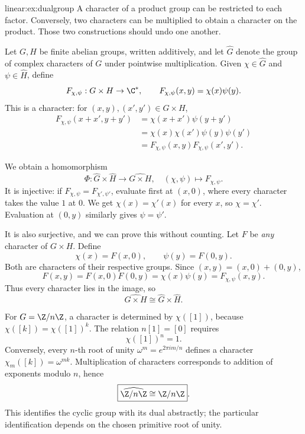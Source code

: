 \begin{solution}{linear:ex:dualgroup}
\idea A character of a product group can be restricted to each factor. Conversely, two characters can be multiplied to obtain a character on the product. Those two constructions should undo one another.

\writeup Let $G,H$ be finite abelian groups, written additively, and let $\widehat G$ denote the group of complex characters of $G$ under pointwise multiplication. Given $\chi\in\widehat G$ and $\psi\in\widehat H$, define
\[
F_{\chi,\psi}:G\times H\to\C^*,
\qquad
F_{\chi,\psi}(x,y)=\chi(x)\psi(y).
\]
This is a character: for $(x,y),(x',y')\in G\times H$,
\[
\begin{aligned}
F_{\chi,\psi}(x+x',y+y')
&=\chi(x+x')\psi(y+y')\\
&=\chi(x)\chi(x')\psi(y)\psi(y')\\
&=F_{\chi,\psi}(x,y)F_{\chi,\psi}(x',y').
\end{aligned}
\]

We obtain a homomorphism
\[
\Phi:\widehat G\times\widehat H\longrightarrow\widehat{G\times H},
\quad(\chi,\psi)\mapsto F_{\chi,\psi}.
\]
It is injective: if $F_{\chi,\psi}=F_{\chi',\psi'}$, evaluate first at $(x,0)$, where every character takes the value $1$ at $0$. We get $\chi(x)=\chi'(x)$ for every $x$, so $\chi=\chi'$. Evaluation at $(0,y)$ similarly gives $\psi=\psi'$.

It is also surjective, and we can prove this without counting. Let $F$ be \emph{any} character of $G\times H$. Define
\[
\chi(x)=F(x,0),\qquad \psi(y)=F(0,y).
\]
Both are characters of their respective groups. Since $(x,y)=(x,0)+(0,y)$,
\[
F(x,y)=F(x,0)F(0,y)=\chi(x)\psi(y)=F_{\chi,\psi}(x,y).
\]
Thus every character lies in the image, so
\[
\boxed{\widehat{G\times H}\cong\widehat G\times\widehat H}.
\]

For $G=\Z/n\Z$, a character is determined by $\chi([1])$, because $\chi([k])=\chi([1])^k$. The relation $n[1]=[0]$ requires
\[
\chi([1])^n=1.
\]
Conversely, every $n$-th root of unity $\omega^m=e^{2\pi im/n}$ defines a character $\chi_m([k])=\omega^{mk}$. Multiplication of characters corresponds to addition of exponents modulo $n$, hence
\[
\boxed{\widehat{\Z/n\Z}\cong\Z/n\Z}.
\]
This identifies the cyclic group with its dual abstractly; the particular identification depends on the chosen primitive root of unity.
\end{solution}

